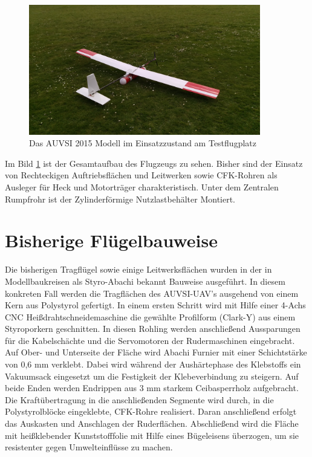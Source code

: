 \begin{figure}[H]
\centering
\includegraphics[width=0.9\textwidth]{bilder/Fotos/AUVSI_2015.jpg} 
\caption{Das AUVSI 2015 Modell im Einsatzzustand am Testflugplatz} 
\label{fig:Das AUVSI 2015 Modell in Einsatzzustand am Testflugplatz}
\end{figure}

Im Bild \ref{fig:Das AUVSI 2015 Modell in Einsatzzustand am Testflugplatz} ist der Gesamtaufbau des Flugzeugs zu sehen. Bisher sind der Einsatz von Rechteckigen Auftriebsflächen und Leitwerken sowie CFK-Rohren als Ausleger für Heck und Motorträger charakteristisch. Unter dem Zentralen Rumpfrohr ist der Zylinderförmige Nutzlastbehälter Montiert.


\clearpage


\section{Bisherige Flügelbauweise}

Die bisherigen Tragflügel sowie einige Leitwerksflächen wurden in der in Modellbaukreisen als \glqq Styro-Abachi\glqq{}  bekannt Bauweise ausgeführt. In diesem konkreten Fall werden die Tragflächen des AUVSI-UAV's ausgehend von einem Kern aus Polystyrol gefertigt. In einem ersten Schritt wird mit Hilfe einer 4-Achs CNC Heißdrahtschneidemaschine die gewählte Profilform (Clark-Y) aus einem Styroporkern geschnitten. In diesen Rohling werden anschließend Aussparungen für die Kabelschächte und die Servomotoren der Rudermaschinen eingebracht. Auf Ober- und Unterseite der Fläche wird Abachi Furnier mit einer Schichtstärke von 0,6 mm verklebt. Dabei wird während der Aushärtephase des Klebstoffs ein Vakuumsack eingesetzt um die Festigkeit der Klebeverbindung zu steigern.
Auf beide Enden werden Endrippen aus 3 mm starkem Ceibasperrholz aufgebracht. Die Kraftübertragung in die anschließenden Segmente wird durch, in die Polystyrolblöcke eingeklebte, CFK-Rohre realisiert. Daran anschließend erfolgt das Auskasten und Anschlagen der Ruderflächen.
Abschließend wird die Fläche mit heißklebender Kunststofffolie mit Hilfe eines Bügeleisens überzogen, um sie resistenter gegen Umwelteinflüsse zu machen.


